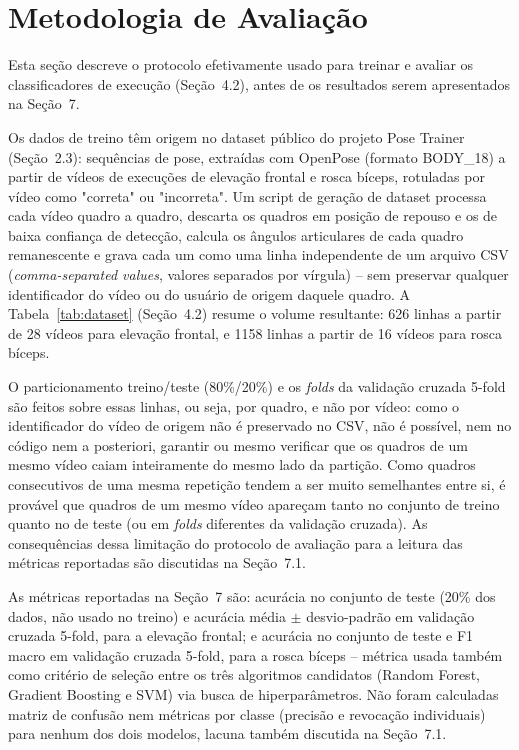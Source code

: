 \documentclass[12pt]{article}
\begin{document}
\section{Metodologia de Avaliação}

Esta seção descreve o protocolo efetivamente usado para treinar e avaliar
os classificadores de execução (Seção~4.2), antes de os resultados serem
apresentados na Seção~7.

Os dados de treino têm origem no dataset público do projeto Pose
Trainer~\cite{chen2020posetrainerrepo} (Seção~2.3): sequências de pose,
extraídas com OpenPose (formato BODY\_18) a partir de vídeos de execuções
de elevação frontal e rosca bíceps, rotuladas por vídeo como "correta" ou
"incorreta". Um script de geração de dataset processa cada vídeo quadro a
quadro, descarta os quadros em posição de repouso e os de baixa confiança
de detecção, calcula os ângulos articulares de cada quadro remanescente e
grava cada um como uma linha independente de um arquivo CSV (\textit{comma-separated values}, valores separados por
vírgula) -- sem
preservar qualquer identificador do vídeo ou do usuário de origem daquele
quadro. A Tabela~\ref{tab:dataset} (Seção~4.2) resume o volume resultante:
626 linhas a partir de 28 vídeos para elevação frontal, e 1158 linhas a
partir de 16 vídeos para rosca bíceps.

O particionamento treino/teste (80\%/20\%) e os \textit{folds} da
validação cruzada 5-fold são feitos sobre essas linhas, ou seja, por
quadro, e não por vídeo: como o identificador do vídeo de origem não é
preservado no CSV, não é possível, nem no código nem a posteriori, garantir
ou mesmo verificar que os quadros de um mesmo vídeo caiam inteiramente do
mesmo lado da partição. Como quadros consecutivos de uma mesma repetição
tendem a ser muito semelhantes entre si, é provável que quadros de um
mesmo vídeo apareçam tanto no conjunto de treino quanto no de teste (ou em
\textit{folds} diferentes da validação cruzada). As consequências dessa
limitação do protocolo de avaliação para a leitura das métricas reportadas
são discutidas na Seção~7.1.

As métricas reportadas na Seção~7 são: acurácia no conjunto de teste (20\%
dos dados, não usado no treino) e acurácia média $\pm$ desvio-padrão em
validação cruzada 5-fold, para a elevação frontal; e acurácia no conjunto
de teste e F1 macro em validação cruzada 5-fold, para a rosca bíceps --
métrica usada também como critério de seleção entre os três algoritmos
candidatos (Random Forest, Gradient Boosting e SVM) via busca de
hiperparâmetros. Não foram calculadas matriz de confusão nem métricas por
classe (precisão e revocação individuais) para nenhum dos dois modelos,
lacuna também discutida na Seção~7.1.
\end{document}
